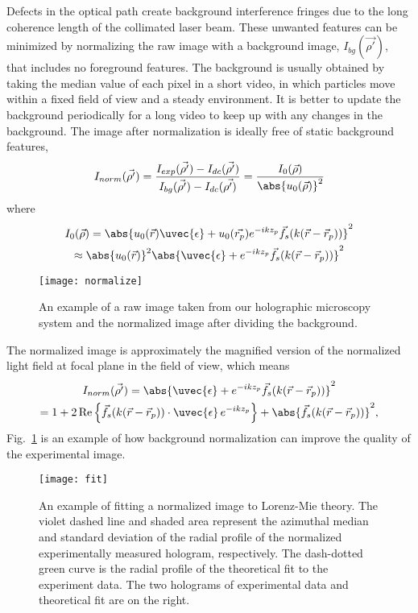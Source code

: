 Defects in the optical path create background interference fringes due to the long coherence length of the collimated laser beam. These unwanted features can be minimized by normalizing the raw image with a background image, $I_{bg} (\vec{\rho'})$, that includes no foreground features. The background is usually  obtained by taking the median value of each pixel in a short video, in which particles move within a fixed field of view and a steady environment. It is better to update the background periodically for a long video to keep up with any changes in the background. The image after normalization is ideally free of static background features, 
\begin{equation}
\label{normalize}
   I_{norm} (\vec{\rho'}) = \frac{I_{exp} (\vec{\rho'}) - I_{dc} (\vec{\rho'})}{I_{bg} (\vec{\rho'}) - I_{dc} (\vec{\rho')}} = \frac{I_0 (\vec{\rho})}{\abs{u_0(\vec{\rho})}^2}
\end{equation}
where
\begin{multline}
  I_0 (\vec{\rho}) = \abs {u_0(\vec{r}) \uvec{\epsilon} + u_0(\vec{r_p}) e^{- i k z_p} 
  \vec{f}_s(k(\vec{r} - \vec{r}_p))} ^2\\
  \approx \abs{ u_0(\vec{r}) }^2 \abs{ \uvec{\epsilon} + e^{- i k z_p} 
  \vec{f}_s( k(\vec{r}- \vec{r}_p) ) } ^2
\end{multline}
\begin{figure}[b!]
  \centering
  \texttt{[image: normalize]}
  \caption[Example of raw and processed images]{An example of a raw image taken from our holographic microscopy system and the normalized image after dividing the background.}
  \label{fig:norm}
\end{figure}
The normalized image is approximately the magnified version of the normalized light field at focal plane in the field of view, which means
\begin{multline}
\label{LMfit}
   I_{norm} (\vec{\rho'})
   =\abs{\uvec{\epsilon} + e^{- i k z_p} \vec{f}_s(k(\vec{r}- \vec{r}_p))} ^2\\
   	=1 + 2 \, \text{Re}\left\{\vec{f}_s(k(\vec{r}-\vec{r}_p)) \cdot 
   \uvec{\epsilon} \, e^{- i k z_p}\right\} + 
   \abs{\vec{f}_s(k(\vec{r}-\vec{r}_p))}^2,
\end{multline}
Fig.~\ref{fig:norm} is an example of how background normalization can improve the quality of the experimental image.

\begin{figure}[b!]
  \centering
  \texttt{[image: fit]}
  \caption[Example of fitting a normalized image]{An example of fitting a normalized image to Lorenz-Mie theory. The violet dashed line and shaded area represent the azimuthal median and standard deviation of the radial profile of the normalized experimentally measured hologram, respectively. The dash-dotted green curve is the radial profile of the theoretical fit to the experiment data. The two holograms of experimental data and theoretical fit are on the right.}
  \label{fig:fit}
\end{figure}

